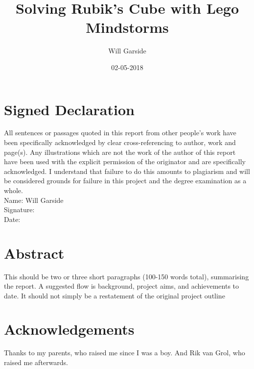 \documentclass{report}
\title{Solving Rubik's Cube with Lego Mindstorms}
\date{02-05-2018}
\author{Will Garside}
\begin{document}
	\maketitle
	\newpage
	
	\renewcommand{\thechapter}{\Roman{chapter}}
	\chapter{Signed Declaration}
	All sentences or passages quoted in this report from other people's work have been specifically acknowledged by clear cross-referencing to author, work and page(s). Any illustrations which are not the work of the author of this report have been used with the explicit permission of the originator and are specifically acknowledged. I understand that failure to do this amounts to plagiarism and will be considered grounds for failure in this project and the degree examination as a whole.
	\\Name: Will Garside
	\\Signature:
	\\Date: 

	\newpage
	\chapter{Abstract}
	This should be two or three short paragraphs (100-150 words total), summarising the report. A suggested flow is background, project aims, and achievements to date. It should not simply be a restatement of the original project outline
	
	\newpage
	\chapter{Acknowledgements}
	Thanks to my parents, who raised me since I was a boy. And Rik van Grol, who raised me afterwards.
	
	\newpage
\end{document}
